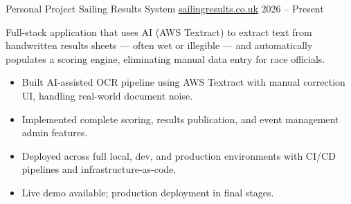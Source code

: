 
  \cventry
    {Personal Project} %
    {Sailing Results System} %
    {\href{https://sailingresults.co.uk}{sailingresults.co.uk}} %
    {2026 – Present} %
    {
      Full-stack application that uses AI (AWS Textract) to extract text from handwritten results sheets — often wet or illegible — and automatically populates a scoring engine, eliminating manual data entry for race officials.
      \begin{itemize}
        \item Built AI-assisted OCR pipeline using AWS Textract with manual correction UI, handling real-world document noise.
        \item Implemented complete scoring, results publication, and event management admin features.
        \item Deployed across full local, dev, and production environments with CI/CD pipelines and infrastructure-as-code.
        \item Live demo available; production deployment in final stages.
      \end{itemize}
    }
